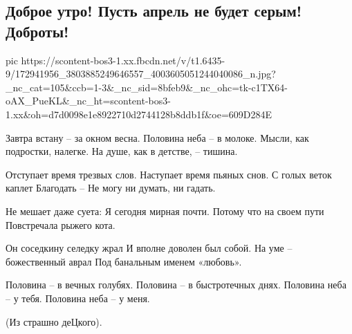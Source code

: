  
 
 
 
 

\subsection{Доброе утро! Пусть апрель не будет серым! Доброты!}

\ifcmt
  pic https://scontent-bos3-1.xx.fbcdn.net/v/t1.6435-9/172941956_3803885249646557_4003605051244040086_n.jpg?_nc_cat=105&ccb=1-3&_nc_sid=8bfeb9&_nc_ohc=tk-c1TX64-oAX_PueKL&_nc_ht=scontent-bos3-1.xx&oh=d7d0098e1e8922710d2744128b8ddb1f&oe=609D284E
\fi

Завтра встану – за окном весна.
Половина неба – в молоке.
Мысли, как подростки, налегке.
На душе, как в детстве, – тишина.

Отступает время трезвых слов.
Наступает время пьяных снов.
С голых веток каплет Благодать –
Не могу ни думать, ни гадать.

Не мешает даже суета:
Я сегодня мирная почти.
Потому что на своем пути
Повстречала рыжего кота.

Он соседкину селедку жрал
И вполне доволен был собой.
На уме – божественный аврал
Под банальным именем «любовь».

Половина – в вечных голубях.
Половина – в быстротечных днях.
Половина неба – у тебя.
Половина неба – у меня.

(Из страшно деЦкого).

